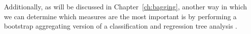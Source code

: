 Additionally, as will be discussed in Chapter~\ref{ch:bagging}, another way in which we can determine which measures are the most important is by performing a bootstrap aggregating version of a classification and regression tree analysis \citep{breimanClassificationRegressionTrees1986,breimanBaggingPredictors1996}.